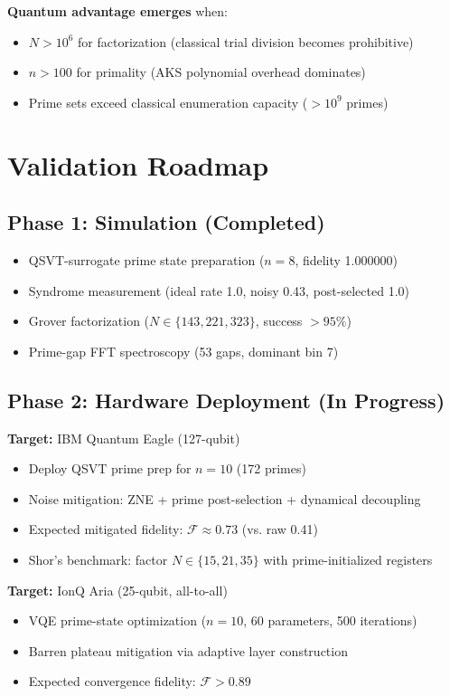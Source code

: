 \documentclass[11pt,letterpaper]{article}
\begin{document}
\textbf{Quantum advantage emerges} when:
\begin{itemize}
\item $N > 10^6$ for factorization (classical trial division becomes prohibitive)
\item $n > 100$ for primality (AKS polynomial overhead dominates)
\item Prime sets exceed classical enumeration capacity ($> 10^9$ primes)
\end{itemize}

\section{Validation Roadmap}

\subsection{Phase 1: Simulation (Completed)}

\begin{itemize}
\item[$\checkmark$] QSVT-surrogate prime state preparation ($n=8$, fidelity 1.000000)
\item[$\checkmark$] Syndrome measurement (ideal rate 1.0, noisy 0.43, post-selected 1.0)
\item[$\checkmark$] Grover factorization ($N \in \{143,221,323\}$, success $>95\%$)
\item[$\checkmark$] Prime-gap FFT spectroscopy (53 gaps, dominant bin 7)
\end{itemize}

\subsection{Phase 2: Hardware Deployment (In Progress)}

\textbf{Target:} IBM Quantum Eagle (127-qubit)
\begin{itemize}
\item Deploy QSVT prime prep for $n=10$ (172 primes)
\item Noise mitigation: ZNE + prime post-selection + dynamical decoupling
\item Expected mitigated fidelity: $\mathcal{F} \approx 0.73$ (vs. raw 0.41)
\item Shor's benchmark: factor $N \in \{15,21,35\}$ with prime-initialized registers
\end{itemize}

\textbf{Target:} IonQ Aria (25-qubit, all-to-all)
\begin{itemize}
\item VQE prime-state optimization ($n=10$, 60 parameters, 500 iterations)
\item Barren plateau mitigation via adaptive layer construction
\item Expected convergence fidelity: $\mathcal{F} > 0.89$
\end{itemize}
\end{document}
